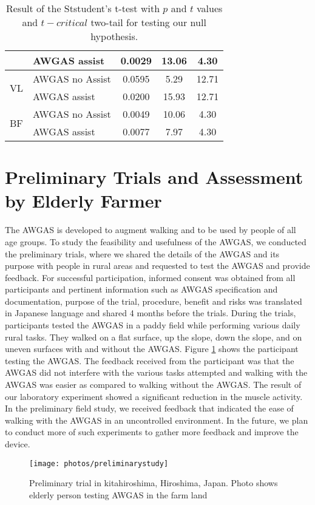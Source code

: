 \documentclass[paper,JRM,paper]{jaciiiarticle}
\begin{document}
\begin{table}[h]
{\begin{tabular}{@{}llccc@{}}
		& AWGAS assist                   & 0.0029  & 13.06   & 4.30                                                           \\ \midrule
		\multirow{2}{*}{VL}  & AWGAS no Assist                & 0.0595  & 5.29    & 12.71                                                          \\ 
		& AWGAS assist                   & 0.0200  & 15.93   & 12.71                                                          \\ \midrule
		\multirow{2}{*}{BF}  & AWGAS no Assist                & 0.0049  & 10.06   & 4.30                                                           \\ 
		& AWGAS assist                   & 0.0077  & 7.97    & 4.30                                                           \\ \bottomrule
	\end{tabular}
	}
	\caption{Result of the Ststudent's t-test with $p$ and $t$ values and $t-critical$ two-tail for testing our null hypothesis.}
	\label{ttestresult}
\end{table}

\section{Preliminary Trials and Assessment by Elderly Farmer}

The AWGAS is developed to augment walking and to be used by people of all age groups. To study the feasibility and usefulness of the AWGAS, we conducted the preliminary trials, where we shared the details of the AWGAS and its purpose with people in rural areas and requested to test the AWGAS and provide feedback. For successful participation, informed consent was obtained from all participants and pertinent information such as AWGAS specification and documentation, purpose of the trial, procedure, benefit and risks was translated in Japanese language and shared 4 months before the trials. During the trials, participants tested the AWGAS in a paddy field while performing various daily rural tasks. They walked on a flat surface, up the slope, down the slope, and on uneven surfaces with and without the AWGAS. Figure \ref{fig:preliminarystudy} shows the participant testing the AWGAS. The feedback received from the participant was that the AWGAS did not interfere with the various tasks attempted and walking with the AWGAS was easier as compared to walking without the AWGAS. The result of our laboratory experiment showed a significant reduction in the muscle activity. In the preliminary field study, we received feedback that indicated the ease of walking with the AWGAS in an uncontrolled environment. In the future, we plan to conduct more of such experiments to gather more feedback and improve the device.
\begin{figure}[h]
	\centering
	\texttt{[image: photos/preliminarystudy]}
	\caption{Preliminary trial in kitahiroshima, Hiroshima, Japan. Photo shows elderly person testing AWGAS in the farm land}
	\label{fig:preliminarystudy}
\end{figure}
\end{document}
